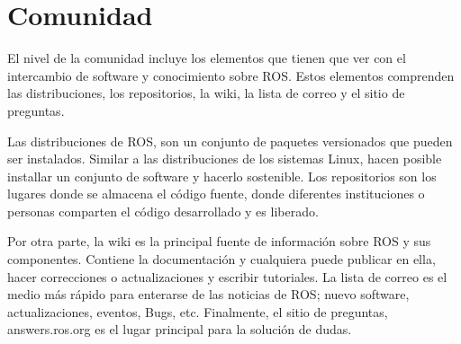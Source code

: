 
\section{Comunidad}

El nivel de la comunidad incluye los elementos que tienen que ver con el intercambio de software y conocimiento sobre ROS. Estos elementos comprenden las distribuciones, los repositorios, la wiki, la lista de correo y el sitio de preguntas.

Las distribuciones de ROS, son un conjunto de paquetes versionados  que pueden ser instalados. Similar a las distribuciones de los sistemas Linux, hacen posible installar un conjunto de software y hacerlo sostenible. Los repositorios son los lugares donde se almacena el código fuente, donde diferentes instituciones o personas comparten el código desarrollado y es liberado.

Por otra parte, la wiki es la principal fuente de información sobre ROS y sus componentes. Contiene la documentación y cualquiera puede publicar en ella, hacer correcciones o actualizaciones y escribir tutoriales. La lista de correo es el medio más rápido para enterarse de las noticias de ROS; nuevo software, actualizaciones, eventos, Bugs, etc. Finalmente, el sitio de preguntas, answers.ros.org es el lugar principal para la solución de dudas.
